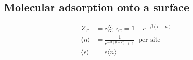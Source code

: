 \subsection*{Molecular adsorption onto a surface}

\begin{equation*}
    \begin{aligned}
        Z_G &= z_G^N; z_G = 1+ e^{-\beta(\epsilon -\mu)} \\
        \langle n \rangle &= \frac{1}{e^{-\beta(\mu-\epsilon)}+1} \; \text{ per site} \\
        \langle \epsilon \rangle &= \epsilon \langle n \rangle
    \end{aligned}
\end{equation*}